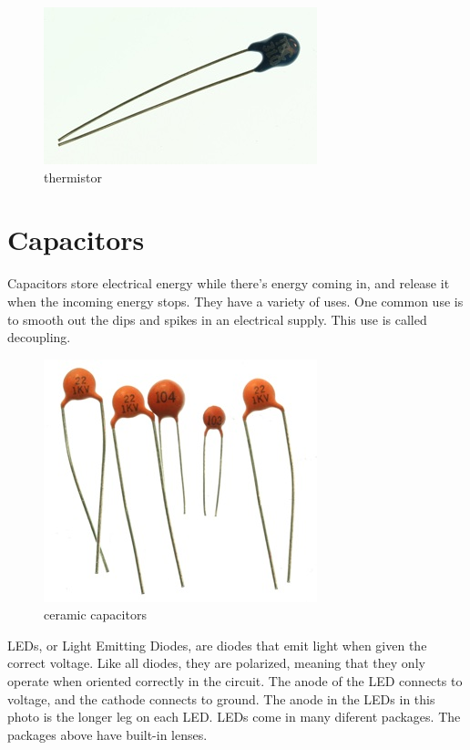 \begin{figure}[!htb]
     \centering
     \includegraphics[scale=0.5]{img/components/thermistor.jpg}
     \caption{thermistor}
     \label{thermistor}
\end{figure}



\section{Capacitors}

Capacitors store electrical energy while there's energy coming in, and release it when the incoming energy stops. They have a variety of uses. One common use is to smooth out the dips and spikes in an electrical supply. This use is called decoupling.

\begin{figure}[!htb]
     \centering
     \includegraphics[scale=0.3]{img/components/caps_ceramic.jpg}
     \caption{ceramic capacitors}
     \label{ceramic capacitors}
\end{figure}

LEDs, or Light Emitting Diodes, are diodes that emit light when given the correct voltage. Like all diodes, they are polarized, meaning that they only operate when oriented correctly in the circuit. The anode of the LED connects to voltage, and the cathode connects to ground. The anode in the LEDs in this photo is the longer leg on each LED. LEDs come in many diferent packages. The packages above have built-in lenses.


